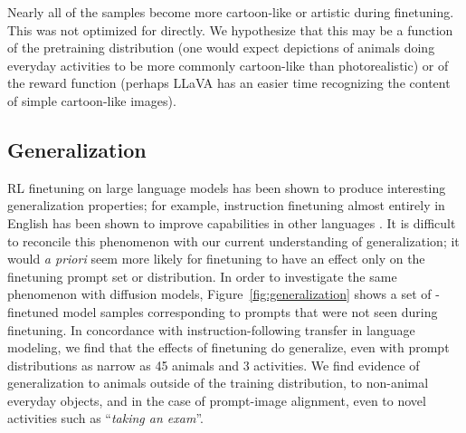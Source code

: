 Nearly all of the samples become more cartoon-like or artistic during finetuning.
This was not optimized for directly.
We hypothesize that this may be a function of the pretraining distribution (one would expect depictions of animals doing everyday activities to be more commonly cartoon-like than photorealistic) or of the reward function (perhaps LLaVA has an easier time recognizing the content of simple cartoon-like images).



\subsection{Generalization}
\label{sec:generalization}

RL finetuning on large language models has been shown to produce interesting generalization properties; for example, instruction finetuning almost entirely in English has been shown to improve capabilities in other languages \citep{ouyang2022instructgpt}.
It is difficult to reconcile this phenomenon with our current understanding of generalization; it would \emph{a priori} seem more likely for finetuning to have an effect only on the finetuning prompt set or distribution.
In order to investigate the same phenomenon with diffusion models, Figure~\ref{fig:generalization} shows a set of \methodours{}-finetuned model samples corresponding to prompts that were not seen during finetuning.
In concordance with instruction-following transfer in language modeling, we find that the effects of finetuning do generalize, even with prompt distributions as narrow as 45 animals and 3 activities.
We find evidence of generalization to animals outside of the training distribution, to non-animal everyday objects, and in the case of prompt-image alignment, even to novel activities such as ``\emph{taking an exam}''.











